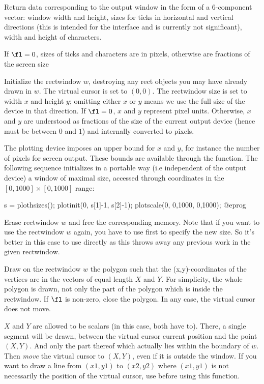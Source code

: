 \label{se:plothsizes}
Return data corresponding to the output window
in the form of a 6-component vector: window width and height, sizes for ticks
in horizontal and vertical directions (this is intended for the 
interface and is currently not significant), width and height of characters.

If $\fl = 0$, sizes of ticks and characters are in
pixels, otherwise are fractions of the screen size

\label{se:plotinit}
Initialize the rectwindow $w$,
destroying any rect objects you may have already drawn in $w$. The virtual
cursor is set to $(0,0)$. The rectwindow size is set to width $x$ and height
$y$; omitting either $x$ or $y$ means we use the full size of the device
in that direction.
If $\fl=0$, $x$ and $y$ represent pixel units. Otherwise, $x$ and $y$
are understood as fractions of the size of the current output device (hence
must be between $0$ and $1$) and internally converted to pixels.

The plotting device imposes an upper bound for $x$ and $y$, for instance the
number of pixels for screen output. These bounds are available through the
 function. The following sequence initializes in a portable
way (i.e independent of the output device) a window of maximal size, accessed
through coordinates in the $[0,1000] \times [0,1000]$ range:

\bprog
s = plothsizes();
plotinit(0, s[1]-1, s[2]-1);
plotscale(0, 0,1000, 0,1000);
@eprog

\label{se:plotkill}
Erase rectwindow $w$ and free the corresponding memory. Note that if you
want to use the rectwindow $w$ again, you have to use  first
to specify the new size. So it's better in this case to use 
directly as this throws away any previous work in the given rectwindow.

\label{se:plotlines}
Draw on the rectwindow $w$
the polygon such that the (x,y)-coordinates of the vertices are in the
vectors of equal length $X$ and $Y$. For simplicity, the whole
polygon is drawn, not only the part of the polygon which is inside the
rectwindow. If $\fl$ is non-zero, close the polygon. In any case, the
virtual cursor does not move.

$X$ and $Y$ are allowed to be scalars (in this case, both have to).
There, a single segment will be drawn, between the virtual cursor current
position and the point $(X,Y)$. And only the part thereof which
actually lies within the boundary of $w$. Then \emph{move} the virtual cursor
to $(X,Y)$, even if it is outside the window. If you want to draw a
line from $(x1,y1)$ to $(x2,y2)$ where $(x1,y1)$ is not necessarily the
position of the virtual cursor, use  before using this
function.

